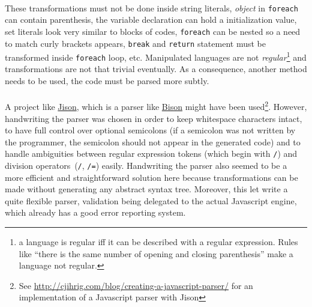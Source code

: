 \documentclass{article}
\begin{document}
\begin{sloppypar}
\paragraph{}
These transformations must not be done inside string literals, {\itshape object} in \lstinline!foreach! can contain parenthesis, the variable declaration can hold a initialization value, set literals look very similar to blocks of codes, \lstinline!foreach! can be nested so a need to match curly brackets appears, \lstinline!break! and \lstinline!return! statement must be transformed inside \lstinline!foreach! loop, etc. Manipulated languages are not {\itshape regular}\footnote{a language is regular iff it can be described with a regular expression. Rules like “there is the same number of opening and closing parenthesis” make a language not regular.} and transformations are not that trivial eventually. As a consequence, another method needs to be used, the code must be parsed more subtly.

\paragraph{}
A project like \href{http://zaach.github.io/jison/}{Jison}, which is a parser like \href{http://www.gnu.org/software/bison/}{Bison} might have been used\footnote{See \href{http://cjihrig.com/blog/creating-a-javascript-parser/}{http://cjihrig.com/blog/creating-a-javascript-parser/} for an implementation of a Javascript parser with Jison}. However, handwriting the parser was chosen in order to keep whitespace characters intact, to have full control over optional semicolons (if a semicolon was not written by the programmer, the semicolon should not appear in the generated code) and to handle ambiguities between regular expression tokens (which begin with \lstinline!/!) and division operators (\lstinline!/!, \lstinline!/=!) easily. Handwriting the parser also seemed to be a more efficient and straightforward solution here because transformations can be made without generating any abstract syntax tree. Moreover, this let write a quite flexible parser, validation being delegated to the actual Javascript engine, which already has a good error reporting system.

\end{sloppypar}
\end{document}
